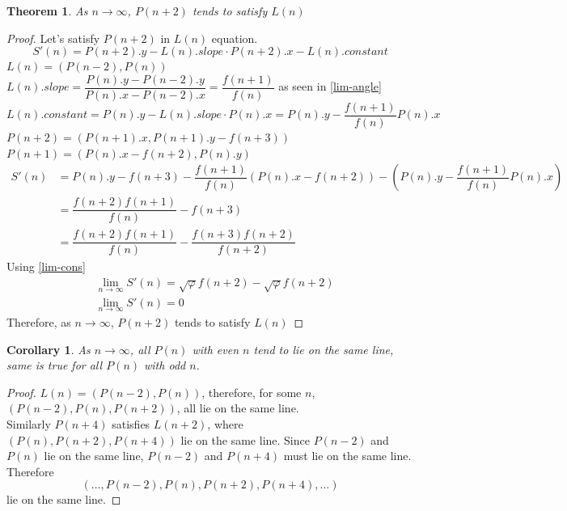 \documentclass[preprint,12pt]{elsarticle}
\newtheorem{theorem}{Theorem}[section]
\newtheorem{corollary}{Corollary}[theorem]
\begin{document}
	\begin{theorem}
		As $n \to \infty$, $P(n+2)$ tends to satisfy $L(n)$
	\end{theorem}
	\begin{proof}
		Let's satisfy $P(n+2)$ in $L(n)$ equation.
		$$S'(n) = P(n+2).y - L(n).slope \cdot P(n+2).x - L(n).constant$$
		$L(n) = (P(n-2), P(n))$\\
		$L(n).slope = \dfrac{P(n).y-P(n-2).y}{P(n).x-P(n-2).x} = \dfrac{f(n+1)}{f(n)}$ as seen in \ref{lim-angle}\\
		$L(n).constant = P(n).y - L(n).slope \cdot P(n).x = P(n).y - \dfrac{f(n+1)}{f(n)} P(n).x$\\
		$P(n+2) = (P(n+1).x, P(n+1).y-f(n+3))$\\
		$P(n+1) = (P(n).x - f(n+2), P(n).y)$
		\begin{align*}
		S'(n) &= P(n).y - f(n+3)-\dfrac{f(n+1)}{f(n)}(P(n).x-f(n+2))-\left(P(n).y-\dfrac{f(n+1)}{f(n)}P(n).x\right)\\
		&= \dfrac{f(n+2)f(n+1)}{f(n)}-f(n+3)\\
		&= \dfrac{f(n+2)f(n+1)}{f(n)}-\dfrac{f(n+3)f(n+2)}{f(n+2)}
		\end{align*}
		Using \ref{lim-cons}
		\begin{align*}
		&\lim_{n \to \infty} S'(n) = \sqrt{\varphi}f(n+2) - \sqrt{\varphi}f(n+2)\\
		&\lim_{n \to \infty} S'(n) = 0
		\end{align*}
		Therefore, as $n\to\infty$, $P(n+2)$ tends to satisfy $L(n)$
	\end{proof}
	\begin{corollary}
		As $n \to \infty$, all $P(n)$ with even $n$ tend to lie on the same line, same is true for all $P(n)$ with odd $n$.
	\end{corollary}
	\begin{proof}
		$L(n) = (P(n-2), P(n))$, therefore, for some $n$, $(P(n-2), P(n), P(n+2))$, all lie on the same line.\\
		Similarly $P(n+4)$ satisfies $L(n+2)$, where $(P(n), P(n+2), P(n+4))$ lie on the same line. Since $P(n-2)$ and $P(n)$ lie on the same line, $P(n-2)$ and $P(n+4)$ must lie on the same line.\\
		Therefore $$(\ldots, P(n-2), P(n), P(n+2), P(n+4),\ldots)$$ lie on the same line.
	\end{proof}
	
\end{document}
